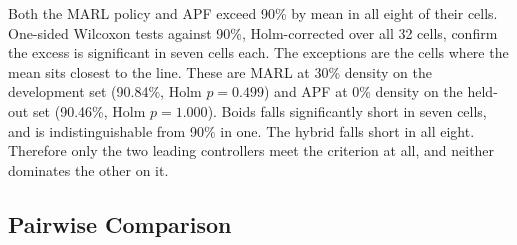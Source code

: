 \documentclass[a4paper, 10pt, conference]{ieeeconf}
\begin{document}
Both the MARL policy and APF exceed 90\% by mean in all eight of their
cells. One-sided Wilcoxon tests against 90\%, Holm-corrected over all
32 cells, confirm the excess is significant in seven cells each. The
exceptions are the cells where the mean sits closest to the line.
These are MARL at 30\% density on the development set (90.84\%, Holm
$p = 0.499$) and APF at 0\% density on the held-out set (90.46\%, Holm
$p = 1.000$). Boids falls significantly short in seven cells, and is
indistinguishable from 90\% in one. The hybrid falls short in all
eight. Therefore only the two leading controllers meet the criterion
at all, and neither dominates the other on it.

\subsection{Pairwise Comparison}\label{sec:pairwise}
\end{document}
